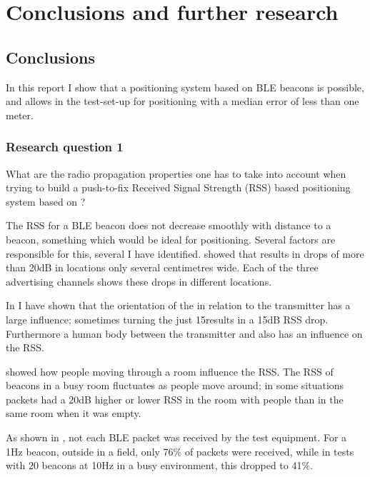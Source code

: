\chapter{Conclusions and further research}
\section{Conclusions}
In this report I show that a positioning system based on BLE beacons is possible, and allows in the test-set-up for positioning with a median error of less than one meter.

\subsection{Research question 1}
\begin{em}
    What are the radio propagation properties one has to take into account when trying to build a push-to-fix Received Signal Strength (RSS) based positioning system based on \BLE?
\end{em}
The RSS for a BLE beacon does not decrease smoothly with distance to a beacon, something which would be ideal for positioning.
Several factors are responsible for this, several I have identified.
 showed that \mpi results in drops of more than 20dB in locations only several centimetres wide.
Each of the three advertising channels shows these drops in different locations.

In  I have shown that the orientation of the \device in relation to the transmitter has a large influence; sometimes turning the \device just 15\tdegree results in a 15dB RSS drop.
Furthermore a human body between the transmitter and \device also has an influence on the RSS.

 showed how people moving through a room influence the RSS.
The RSS of beacons in a busy room fluctuates as people move around; in some situations packets had a 20dB higher or lower RSS in the room with people than in the same room when it was empty.

As shown in , not each BLE packet was received by the test equipment.
For a 1Hz beacon, outside in a field, only 76\% of packets were received, while in tests with 20 beacons at 10Hz in a busy environment, this dropped to 41\%.

